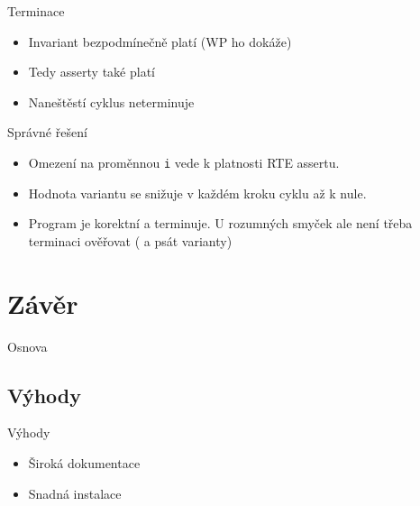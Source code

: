 \documentclass[11pt]{beamer}
\begin{document}

\begin{frame}{Terminace}
	\lstExIIwpItryIV
	\begin{itemize}
		\item Invariant bezpodmínečně platí (WP ho dokáže)
		\item Tedy asserty také platí
		\pause \item Naneštěstí cyklus neterminuje
	\end{itemize}
\end{frame}


\begin{frame}{Správné řešení}
	\lstExIIwpItryV
	\begin{itemize}
		\item Omezení na proměnnou \texttt{i} vede k platnosti RTE assertu.
		\item Hodnota variantu se snižuje v každém kroku cyklu až k nule.
		\item Program je korektní a terminuje. U rozumných smyček ale není třeba terminaci ověřovat ( a psát varianty)
	\end{itemize}
\end{frame}


\section{Závěr}

\begin{frame}{Osnova}
\end{frame}

\subsection{Výhody}
\begin{frame}{Výhody}
	\begin{itemize}
		\item Široká dokumentace
		\item Snadná instalace
	\end{itemize}
\end{frame}
\end{document}
